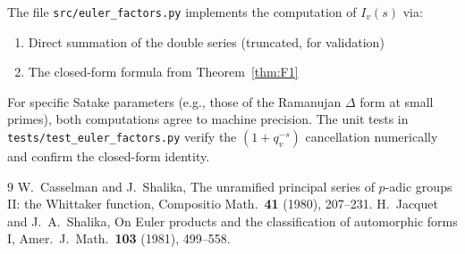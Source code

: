 \documentclass[12pt]{article}
\begin{document}
The file \texttt{src/euler\_factors.py} implements the computation of $I_v(s)$ via:
\begin{enumerate}
  \item Direct summation of the double series (truncated, for validation)
  \item The closed-form formula from Theorem~\ref{thm:F1}
\end{enumerate}
For specific Satake parameters (e.g., those of the Ramanujan $\Delta$ form at small
primes), both computations agree to machine precision.  The unit tests in
\texttt{tests/test\_euler\_factors.py} verify the $(1+q_v^{-s})$ cancellation
numerically and confirm the closed-form identity.

\begin{thebibliography}{9}
 W.~Casselman and J.~Shalika, The unramified principal series of
  $p$-adic groups II: the Whittaker function, Compositio Math.\ \textbf{41} (1980), 207--231.
 H.~Jacquet and J.~A.~Shalika, On Euler products and the classification of
  automorphic forms I, Amer.\ J.\ Math.\ \textbf{103} (1981), 499--558.
\end{thebibliography}
\end{document}
